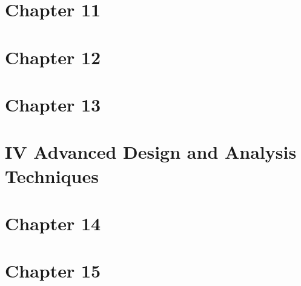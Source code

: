 \documentclass[12pt,a4paper]{article}
\begin{document}




\pagebreak


\section*{Chapter 11}






\pagebreak


\section*{Chapter 12}






\pagebreak

\section*{Chapter 13}






\pagebreak



\section*{IV Advanced Design and Analysis Techniques}
\pagebreak

\section*{Chapter 14}

\pagebreak

\section*{Chapter 15}













\end{document}
